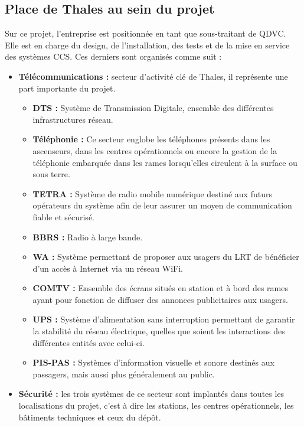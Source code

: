 \subsection{Place de Thales au sein du projet}

Sur ce projet, l'entreprise est positionnée en tant que sous-traitant de QDVC. Elle est en charge du design, de l'installation, des tests et de la mise en service des systèmes \gls{CCS}. Ces derniers sont organisés comme suit :

\begin{itemize}
\item \textbf{Télécommunications :} secteur d'activité clé de Thales, il représente une part importante du projet.
\begin{itemize}
\item \textbf{\gls{DTS} :} Système de Transmission Digitale, ensemble des différentes infrastructures réseau.
\item \textbf{Téléphonie :} Ce secteur englobe les téléphones présents dans les ascenseurs, dans les centres opérationnels ou encore la gestion de la téléphonie embarquée dans les rames lorsqu'elles circulent à la surface ou sous terre.
\item \textbf{\gls{TETRA} :} Système de radio mobile numérique destiné aux futurs opérateurs du système afin de leur assurer un moyen de communication fiable et sécurisé.
\item \textbf{BBRS :} Radio à large bande. %
\item \textbf{\gls{WA} :} Système permettant de proposer aux usagers du LRT de bénéficier d'un accès à Internet via un réseau WiFi.
\item \textbf{\gls{COMTV} :} Ensemble des écrans situés en station et à bord des rames ayant pour fonction de diffuser des annonces publicitaires aux usagers.
\item \textbf{\gls{UPS} :} Système d'alimentation sans interruption permettant de garantir la stabilité du réseau électrique, quelles que soient les interactions des différentes entités avec celui-ci.
\item \textbf{\gls{PIS}-\gls{PAS} :} Systèmes d'information visuelle et sonore destinés aux passagers, mais aussi plus généralement au public.
\end{itemize}
\item \textbf{Sécurité :} les trois systèmes de ce secteur sont implantés dans toutes les localisations du projet, c'est à dire les stations, les centres opérationnels, les bâtiments techniques et ceux du dépôt.

\end{itemize}
